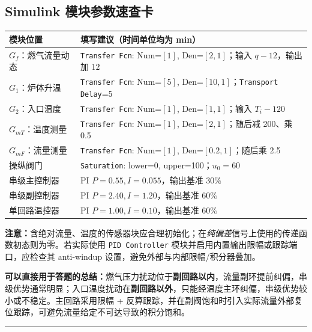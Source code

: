 \documentclass[UTF8,a4paper,11pt]{ctexart}
\begin{document}
\subsection*{Simulink 模块参数速查卡}
\begin{center}
\small
\begin{tabular}{>{\raggedright\arraybackslash}p{.33\linewidth}>{\raggedright\arraybackslash}p{.57\linewidth}}
\toprule
模块位置 & 填写建议（时间单位均为 min）\\
\midrule
$G_f$：燃气流量动态 & \texttt{Transfer Fcn}: Num=$[1]$, Den=$[2,1]$；输入 $q-12$，输出加 $12$\\
$G_1$：炉体升温 & \texttt{Transfer Fcn}: Num=$[5]$, Den=$[10,1]$；\texttt{Transport Delay}=5\\
$G_2$：入口温度 & \texttt{Transfer Fcn}: Num=$[1]$, Den=$[1,1]$；输入 $T_i-120$\\
$G_{mT}$：温度测量 & \texttt{Transfer Fcn}: Num=$[1]$, Den=$[2,1]$；随后减 200、乘 0.5\\
$G_{mF}$：流量测量 & \texttt{Transfer Fcn}: Num=$[1]$, Den=$[0.2,1]$；随后乘 2.5\\
操纵阀门 & \texttt{Saturation}: lower=0, upper=100；$u_0=60$\\
串级主控制器 & PI $P=0.55, I=0.055$，输出基准 $30\%$\\
串级副控制器 & PI $P=2.40, I=1.20$，输出基准 $60\%$\\
单回路温控器 & PI $P=1.00, I=0.10$，输出基准 $60\%$\\
\bottomrule
\end{tabular}
\end{center}
\noindent\textbf{注意：}含绝对流量、温度的传感器块应合理初始化；在\emph{纯偏差}信号上使用的传递函数初态则为零。若实际使用 \texttt{PID Controller} 模块并启用内置输出限幅或跟踪端口，应检查其 anti-windup 设置，避免外部与内部限幅/积分器叠加。

\vspace{1mm}
\begin{notebox}
\textbf{可以直接用于答题的总结：}燃气压力扰动位于\textbf{副回路以内}，流量副环提前纠偏，串级优势通常明显；入口温度扰动在\textbf{副回路以外}，只能经温度主环纠偏，串级优势较小或不稳定。主回路采用限幅 + 反算跟踪，并在副阀饱和时引入实际流量外部复位跟踪，可避免流量给定不可达导致的积分饱和。
\end{notebox}
\vspace{4mm}
\noindent\rule{\linewidth}{.3pt}
\end{document}
